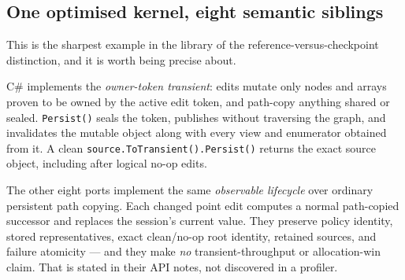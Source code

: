 \documentclass[11pt,twoside,openright]{book}
\newcommand{\code}[1]{\texorpdfstring{\textcolor{d7ink}{\texttt{#1}}}{#1}}
\newcommand{\term}[1]{\textit{#1}}
\begin{document}
\subsection{One optimised kernel, eight semantic siblings}

This is the sharpest example in the library of the reference-versus-checkpoint
distinction, and it is worth being precise about.

C\# implements the \term{owner-token transient}: edits mutate only nodes and
arrays proven to be owned by the active edit token, and path-copy anything
shared or sealed. \code{Persist()} seals the token, publishes without traversing
the graph, and invalidates the mutable object along with every view and
enumerator obtained from it. A clean \code{source.ToTransient().Persist()}
returns the exact source object, including after logical no-op edits.

The other eight ports implement the same \emph{observable lifecycle} over
ordinary persistent path copying. Each changed point edit computes a normal
path-copied successor and replaces the session's current value. They preserve
policy identity, stored representatives, exact clean/no-op root identity,
retained sources, and failure atomicity --- and they make \emph{no}
transient-throughput or allocation-win claim. That is stated in their API notes,
not discovered in a profiler.
\end{document}
